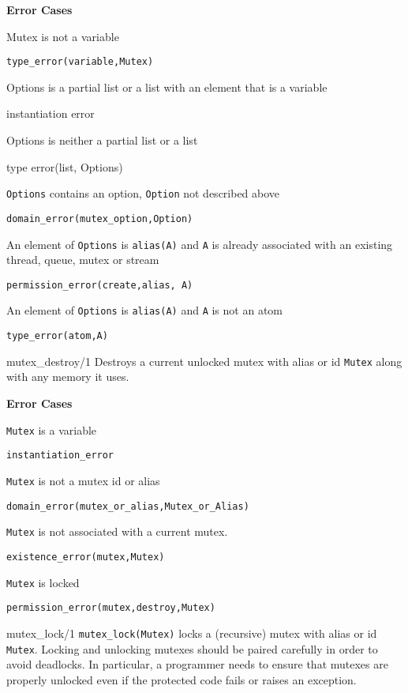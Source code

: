 \begin{description}
{\bf Error Cases}
\bi
\item 	Mutex is not a variable
\bi
\item 	{\tt type\_error(variable,Mutex)}
\ei
\item Options is a partial list or a list with an element that is a
  variable 
\bi
\item  instantiation error
\ei
\item Options is neither a partial list or a list
\bi
\item  type error(list, Options)
\ei
\item 	{\tt Options} contains an option, {\tt Option} not described above
\bi
\item 	{\tt domain\_error(mutex\_option,Option)}
\ei
%
\item An element of {\tt Options} is {\tt alias(A)} and {\tt A} is
  already associated with an existing thread, queue, mutex or stream 
\bi
\item {\tt permission\_error(create,alias, A)}
\ei
\item An element of {\tt Options} is {\tt alias(A)} and {\tt A} is not an atom
\bi
\item {\tt type\_error(atom,A)}
\ei
\ei

{mutex\_destroy/1}
%
Destroys a current unlocked mutex with alias or id {\tt Mutex} along
with any memory it uses.

{\bf Error Cases}
\bi
\item 	{\tt Mutex} is a variable
\bi
\item 	{\tt instantiation\_error}
\ei
%
\item 	{\tt Mutex} is not a mutex id or alias
\bi
\item 	{\tt domain\_error(mutex\_or\_alias,Mutex\_or\_Alias)}
\ei
%
\item 	{\tt Mutex} is not associated with a current mutex.
\bi
\item 	{\tt existence\_error(mutex,Mutex)}
\ei
\item 	{\tt Mutex} is locked
\bi
\item 	{\tt permission\_error(mutex,destroy,Mutex)}
\ei
\ei

{mutex\_lock/1}
%
{\tt mutex\_lock(Mutex)} locks a (recursive) mutex with alias or id
{\tt Mutex}. Locking and unlocking mutexes should be paired carefully
in order to avoid deadlocks. In particular, a programmer needs to
ensure that mutexes are properly unlocked even if the protected code
fails or raises an exception.


\end{description}
